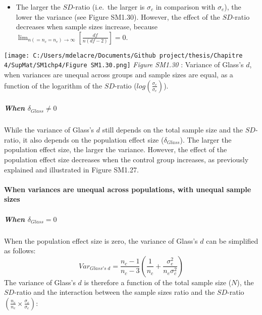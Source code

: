 \documentclass[
  english,
  man,mask,floatsintext]{apa6}
\providecommand{\tightlist}{%
  \setlength{\itemsep}{0pt}\setlength{\parskip}{0pt}}
\let\oldparagraph\paragraph
\renewcommand{\paragraph}[1]{\oldparagraph{#1}\mbox{}}
\let\oldsubparagraph\subparagraph
\renewcommand{\subparagraph}[1]{\oldsubparagraph{#1}\mbox{}}
\begin{document}
\newpage

\begin{itemize}
\tightlist
\item
  The larger the \(SD\)-ratio (i.e.~the larger is \(\sigma_c\) in comparison with \(\sigma_e\)), the lower the variance (see Figure SM1.30). However, the effect of the \(SD\)-ratio decreases when sample sizes increase, because \(\lim_{n(=n_c=n_e)\rightarrow \infty}\left[\frac{df}{n(df-2)} \right]=0\).
\end{itemize}

\texttt{[image: C:/Users/mdelacre/Documents/Github project/thesis/Chapitre 4/SupMat/SM1chp4/Figure SM1.30.png]}
\emph{Figure SM1.30} : Variance of Glass's \(d\), when variances are unequal across groups and sample sizes are equal, as a function of the logarithm of the \(SD\)-ratio (\(log \left( \frac{\sigma_c}{\sigma_e} \right)\)).

\hypertarget{when-delta_glass-neq-0-1}{%
\subparagraph{\texorpdfstring{When \(\delta_{Glass} \neq 0\)}{When \textbackslash delta\_\{Glass\} \textbackslash neq 0}}\label{when-delta_glass-neq-0-1}}

While the variance of Glass's \(d\) still depends on the total sample size and the \(SD\)-ratio, it also depends on the population effect size (\(\delta_{Glass}\)). The larger the population effect size, the larger the variance. However, the effect of the population effect size decreases when the control group increases, as previously explained and illustrated in Figure SM1.27.

\newpage

\hypertarget{when-variances-are-unequal-across-populations-with-unequal-sample-sizes-2}{%
\paragraph{When variances are unequal across populations, with unequal sample sizes}\label{when-variances-are-unequal-across-populations-with-unequal-sample-sizes-2}}

\hypertarget{when-delta_glass-0-1}{%
\subparagraph{\texorpdfstring{When \(\delta_{Glass} = 0\)}{When \textbackslash delta\_\{Glass\} = 0}}\label{when-delta_glass-0-1}}

When the population effect size is zero, the variance of Glass's \(d\) can be simplified as follows:
\[Var_{Glass's \; d} = \frac{n_c-1}{n_c-3} \left( \frac{1}{n_c}+\frac{\sigma^2_e}{n_e\sigma^2_c}\right)\]
The variance of Glass's \(d\) is therefore a function of the total sample size (\(N\)), the \(SD\)-ratio and the interaction between the sample sizes ratio and the \(SD\)-ratio \(\left(\frac{n_c}{n_e}\times\frac{\sigma_c}{\sigma_e} \right)\):
\end{document}
